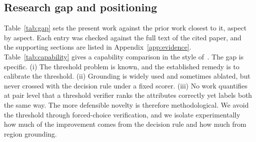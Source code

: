 \documentclass[11pt]{article}
\begin{document}
\subsection{Research gap and positioning}\label{sec:gap}
Table~\ref{tab:gap} sets the present work against the prior work closest to it, aspect by aspect. Each entry was checked against the full text of the cited paper, and the supporting sections are listed in Appendix~\ref{app:evidence}. Table~\ref{tab:capability} gives a capability comparison in the style of~\cite{guo2026vbackchecker,yang2026omnihallu}. The gap is specific. (i) The threshold problem is known, and the established remedy is to calibrate the threshold. (ii) Grounding is widely used and sometimes ablated, but never crossed with the decision rule under a fixed scorer. (iii) No work quantifies at pair level that a threshold verifier ranks the attributes correctly yet labels both the same way. The more defensible novelty is therefore methodological. We avoid the threshold through forced-choice verification, and we isolate experimentally how much of the improvement comes from the decision rule and how much from region grounding.
\end{document}
